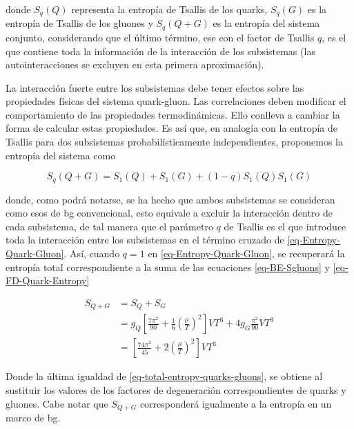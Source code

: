 donde ${S}_{q}(Q)$ representa la entropía de Tsallis de los quarks, ${S}_{q}(G)$ es la entropía de Tsallis de los gluones y ${S}_{q}(Q+G)$ es la entropía del sistema conjunto, considerando que el último término, ese con el factor de Tsallis $q$, es el que contiene toda la información de la interacción de los subsistemas (las autointeracciones se excluyen en esta primera aproximación).

La interacción fuerte entre los subsistemas debe tener efectos sobre las propiedades físicas del sistema quark-gluon. Las correlaciones deben modificar el comportamiento de las propiedades termodinámicas. Ello conlleva a cambiar la forma de calcular estas propiedades. Es así  que, en analogía con la entropía de Tsallis para dos subsistemas probabilísticamente independientes, proponemos la entropía del sistema como

\begin{equation}\label{eq-Entropy-Quark-Gluon}
{S}_{q}(Q + G) = {S}_{1}(Q) + {S}_{1}(G) + (1-q){S}_{1}(Q){S}_{1}(G)
\end{equation}

donde, como podrá notarse, se ha hecho que ambos subsistemas se consideran como esos de \acrshort{bg} convencional, esto equivale a excluir la interacción dentro de cada subsistema, de tal manera que el parámetro $q$ de Tsallis es el que introduce toda la interacción entre los subsistemas en el término cruzado de \eqref{eq-Entropy-Quark-Gluon}. Así, cuando $q=1$ en \eqref{eq-Entropy-Quark-Gluon}, se recuperará la entropía total correspondiente a la suma de las ecuaciones \eqref{eq-BE-Sgluons} y \eqref{eq-FD-Quark-Entropy}

\begin{equation}\label{eq-total-entropy-quarks-gluons}
\begin{split}
{S}_{Q+G} & = {S}_{Q} +{S}_{G} \\
& = {g}_{Q} \left[ \frac{7{\pi}^{2}}{90} + \frac{1}{6} \left(\frac{\mu}{T} \right)^{2}\right] V{T}^{3} + 4{g}_{G} \frac{{\pi}^{2}}{90} V{T}^{3} \\
& = \left[\frac{74{\pi}^{2}}{45} + 2 \left(\frac{\mu}{T} \right)^{2} \right]V{T}^{3}
\end{split}
\end{equation}

Donde la última igualdad de \eqref{eq-total-entropy-quarks-gluons}, se obtiene al sustituir los valores de los factores de degeneración correspondientes de quarks y gluones. Cabe notar que ${S}_{Q+G}$ corresponderá igualmente a la entropía en un marco de \acrshort{bg}. 

